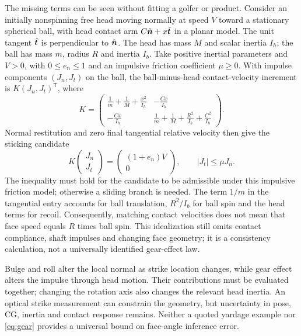 The missing terms can be seen without fitting a golfer or product.
Consider an initially nonspinning free head moving normally at speed $V$ toward a stationary spherical ball, with head contact arm $C\hat{\bm{n}}+x\hat{\bm{t}}$ in a planar model.
The unit tangent $\hat{\bm{t}}$ is perpendicular to $\hat{\bm{n}}$.
The head has mass $M$ and scalar inertia $I_h$; the ball has mass $m$, radius $R$ and inertia $I_b$.
Take positive inertial parameters and $V>0$, with $0\leq e_n\leq1$ and an impulsive friction coefficient $\mu\geq0$.
With impulse components $(J_n,J_t)$ on the ball, the ball-minus-head contact-velocity increment is $K(J_n,J_t)^{\mathsf T}$, where
\begin{equation}
\label{eq:gearcoupledmobility}
K=\begin{pmatrix}
 \frac1m+\frac1M+\frac{x^2}{I_h} & -\frac{Cx}{I_h}\\
 -\frac{Cx}{I_h} & \frac1m+\frac1M+\frac{R^2}{I_b}+\frac{C^2}{I_h}
\end{pmatrix}.
\end{equation}
Normal restitution and zero final tangential relative velocity then give the sticking candidate
\begin{equation}
\label{eq:gearstickcandidate}
K\begin{pmatrix}J_n\\J_t\end{pmatrix}
 =\begin{pmatrix}(1+e_n)V\\0\end{pmatrix},
\qquad |J_t|\leq\mu J_n.
\end{equation}
The inequality must hold for the candidate to be admissible under this impulsive friction model; otherwise a sliding branch is needed.
The term $1/m$ in the tangential entry accounts for ball translation, $R^2/I_b$ for ball spin and the head terms for recoil.
Consequently, matching contact velocities does not mean that face speed equals $R$ times ball spin.
This idealization still omits contact compliance, shaft impulses and changing face geometry; it is a consistency calculation, not a universally identified gear-effect law.

Bulge and roll alter the local normal as strike location changes, while gear effect alters the impulse through head motion.
Their contributions must be evaluated together; changing the rotation axis also changes the relevant head inertia.
An optical strike measurement can constrain the geometry, but uncertainty in pose, CG, inertia and contact response remains.
Neither a quoted yardage example nor \cref{eq:gear} provides a universal bound on face-angle inference error.

